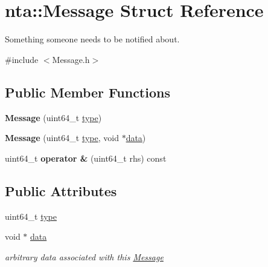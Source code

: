 \hypertarget{structnta_1_1Message}{}\section{nta\+:\+:Message Struct Reference}
\label{structnta_1_1Message}


Something someone needs to be notified about.  




{\ttfamily \#include $<$Message.\+h$>$}

\subsection*{Public Member Functions}
\begin{DoxyCompactItemize}
\item 
\mbox{\label{structnta_1_1Message_adf6da023ce23b9e2cb13adeb88a65e57}} 
{\bfseries Message} (uint64\+\_\+t \hyperlink{structnta_1_1Message_a512ef14eaa86f830247f8194cbbd4f83}{type})
\item 
\mbox{\label{structnta_1_1Message_a3376974320eace529d2e1a557936f7a6}} 
{\bfseries Message} (uint64\+\_\+t \hyperlink{structnta_1_1Message_a512ef14eaa86f830247f8194cbbd4f83}{type}, void $\ast$\hyperlink{structnta_1_1Message_aedaae604be4afb61e1a5d1be15fa8efd}{data})
\item 
\mbox{\label{structnta_1_1Message_ad3c8c3c148cccb68e091bfcb978e56d7}} 
uint64\+\_\+t {\bfseries operator \&} (uint64\+\_\+t rhs) const
\end{DoxyCompactItemize}
\subsection*{Public Attributes}
\begin{DoxyCompactItemize}
\item 
uint64\+\_\+t \hyperlink{structnta_1_1Message_a512ef14eaa86f830247f8194cbbd4f83}{type}
\item 
\mbox{\label{structnta_1_1Message_aedaae604be4afb61e1a5d1be15fa8efd}} 
void $\ast$ \hyperlink{structnta_1_1Message_aedaae604be4afb61e1a5d1be15fa8efd}{data}
\begin{DoxyCompactList}\small\item\em arbitrary data associated with this \hyperlink{structnta_1_1Message}{Message} \end{DoxyCompactList}\end{DoxyCompactItemize}


